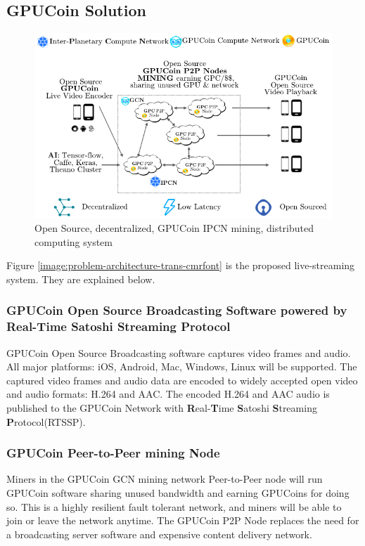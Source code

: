 \documentclass{article}
\begin{document}
\subsection{GPUCoin Solution}

\begin{figure}[h!]
 \centering
 \includegraphics[width=1.0\textwidth]{static/gpctokens-solution-trans-ai-cmrfont}
 \caption{Open Source, decentralized, GPUCoin IPCN mining, distributed computing system}
 \label{image:gpctokens-solution-trans-ai-cmrfont}
\end{figure}


Figure \ref{image:problem-architecture-trans-cmrfont} is the proposed live-streaming system. They are explained below.
\subsubsection{GPUCoin Open Source Broadcasting Software powered by Real-Time Satoshi Streaming Protocol}
GPUCoin Open Source Broadcasting software captures video frames and audio. All major platforms: iOS, Android, Mac, Windows, Linux will be supported. The captured video frames and audio data are encoded to widely accepted open video and audio formats: H.264 and AAC. The encoded H.264 and AAC audio is published to the GPUCoin Network with \textbf{R}eal-\textbf{T}ime \textbf{S}atoshi \textbf{S}treaming \textbf{P}rotocol(RTSSP).

\subsubsection{GPUCoin Peer-to-Peer mining Node}
Miners in the GPUCoin GCN mining network Peer-to-Peer node will run GPUCoin software sharing unused bandwidth and earning GPUCoins for doing so. This is a highly resilient fault tolerant network, and miners will be able to join or leave the network anytime. The GPUCoin P2P Node replaces the need for a broadcasting server software and expensive content delivery network.
\end{document}
